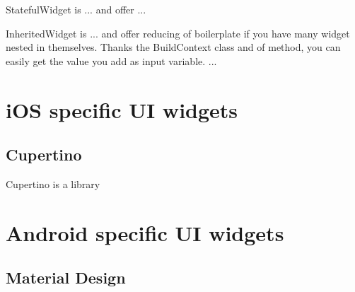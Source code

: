 StatefulWidget is ... and offer ... \cite{statefulWidget}

InheritedWidget is ... and offer reducing of boilerplate if you have many widget nested in themselves. Thanks the BuildContext class and of method, you can easily get the value you add as input variable. ... \cite{inheritedWidget}


\section{iOS specific UI widgets}

\subsection{Cupertino}
Cupertino is a library


\section{Android specific UI widgets}

\subsection{Material Design}